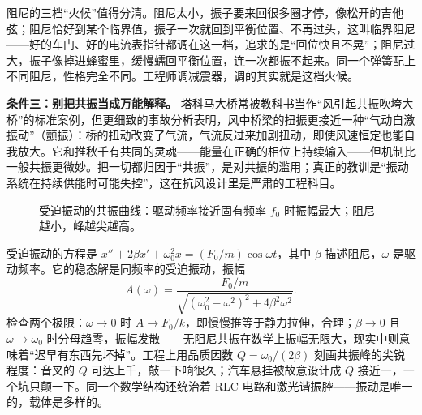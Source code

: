 阻尼的三档“火候”值得分清。阻尼太小，振子要来回很多圈才停，像松开的吉他弦；阻尼恰好到某个临界值，振子一次就回到平衡位置、不再过头，这叫临界阻尼——好的车门、好的电流表指针都调在这一档，追求的是“回位快且不晃”；阻尼过大，振子像掉进蜂蜜里，缓慢蠕回平衡位置，连一次都振不起来。同一个弹簧配上不同阻尼，性格完全不同。工程师调减震器，调的其实就是这档火候。

\textbf{条件三：别把共振当成万能解释。} 塔科马大桥常被教科书当作“风引起共振吹垮大桥”的标准案例，但更细致的事故分析表明，风中桥梁的扭振更接近一种“气动自激振动”（颤振）：桥的扭动改变了气流，气流反过来加剧扭动，即使风速恒定也能自我放大。它和推秋千有共同的灵魂——能量在正确的相位上持续输入——但机制比一般共振更微妙。把一切都归因于“共振”，是对共振的滥用；真正的教训是“振动系统在持续供能时可能失控”，这在抗风设计里是严肃的工程科目。

\begin{figure}[htbp]
\centering
{}
\caption{受迫振动的共振曲线：驱动频率接近固有频率 \(f_0\) 时振幅最大；阻尼越小，峰越尖越高。}
\end{figure}

\begin{challenge}
受迫振动的方程是 \(x''+2\beta x'+\omega_0^2 x=(F_0/m)\cos\omega t\)，其中 \(\beta\) 描述阻尼，\(\omega\) 是驱动频率。它的稳态解是同频率的受迫振动，振幅
\[
  A(\omega)=\frac{F_0/m}{\sqrt{(\omega_0^{2}-\omega^{2})^{2}+4\beta^{2}\omega^{2}}}.
\]
检查两个极限：\(\omega\to 0\) 时 \(A\to F_0/k\)，即慢慢推等于静力拉伸，合理；\(\beta\to 0\) 且 \(\omega\to\omega_0\) 时分母趋零，振幅发散——无阻尼共振在数学上振幅无限大，现实中则意味着“迟早有东西先坏掉”。工程上用品质因数 \(Q=\omega_0/(2\beta)\) 刻画共振峰的尖锐程度：音叉的 \(Q\) 可达上千，敲一下响很久；汽车悬挂被故意设计成 \(Q\) 接近一，一个坑只颠一下。同一个数学结构还统治着 RLC 电路和激光谐振腔——振动是唯一的，载体是多样的。
\end{challenge}


